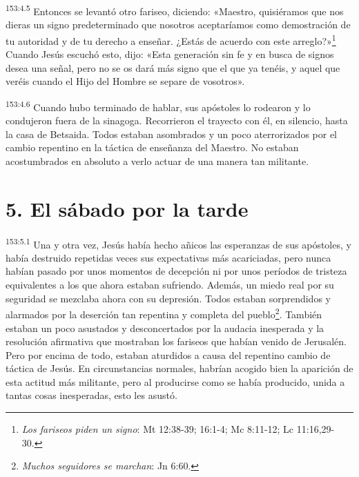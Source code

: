 \par 
\textsuperscript{153:4.5} Entonces se levantó otro fariseo, diciendo: «Maestro, quisiéramos que nos dieras un signo predeterminado que nosotros aceptaríamos como demostración de tu autoridad y de tu derecho a enseñar. ¿Estás de acuerdo con este arreglo?»\footnote{\textit{Los fariseos piden un signo}: Mt 12:38-39; 16:1-4; Mc 8:11-12; Lc 11:16,29-30.} Cuando Jesús escuchó esto, dijo: «Esta generación sin fe y en busca de signos desea una señal, pero no se os dará más signo que el que ya tenéis, y aquel que veréis cuando el Hijo del Hombre se separe de vosotros».

\par 
\textsuperscript{153:4.6} Cuando hubo terminado de hablar, sus apóstoles lo rodearon y lo condujeron fuera de la sinagoga. Recorrieron el trayecto con él, en silencio, hasta la casa de Betsaida. Todos estaban asombrados y un poco aterrorizados por el cambio repentino en la táctica de enseñanza del Maestro. No estaban acostumbrados en absoluto a verlo actuar de una manera tan militante.

\section*{5. El sábado por la tarde}
\par 
\textsuperscript{153:5.1} Una y otra vez, Jesús había hecho añicos las esperanzas de sus apóstoles, y había destruido repetidas veces sus expectativas más acariciadas, pero nunca habían pasado por unos momentos de decepción ni por unos períodos de tristeza equivalentes a los que ahora estaban sufriendo. Además, un miedo real por su seguridad se mezclaba ahora con su depresión. Todos estaban sorprendidos y alarmados por la deserción tan repentina y completa del pueblo\footnote{\textit{Muchos seguidores se marchan}: Jn 6:60.}. También estaban un poco asustados y desconcertados por la audacia inesperada y la resolución afirmativa que mostraban los fariseos que habían venido de Jerusalén. Pero por encima de todo, estaban aturdidos a causa del repentino cambio de táctica de Jesús. En circunstancias normales, habrían acogido bien la aparición de esta actitud más militante, pero al producirse como se había producido, unida a tantas cosas inesperadas, esto les asustó.


